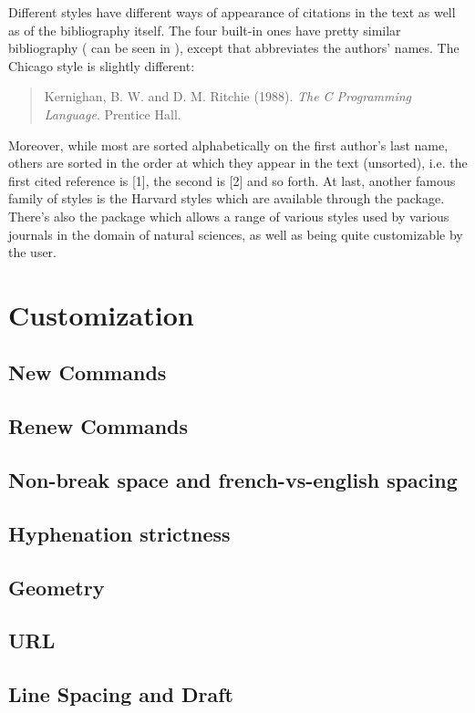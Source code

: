 {Different styles have different ways of appearance of citations in the text as well as of the bibliography itself. The four built-in ones have pretty similar bibliography ( can be seen in ), except that  abbreviates the authors' names. The Chicago style is slightly different:

\begin{quote}
Kernighan, B. W. and D. M. Ritchie (1988). \textit{The C Programming Language}. Prentice Hall.
\end{quote}

Moreover, while most are sorted alphabetically on the first author's last name, others are sorted in the order at which they appear in the text (unsorted), i.e. the first cited reference is [1], the second is [2] and so forth. At last, another famous family of styles is the Harvard styles which are available through the  package. There's also the  package which allows a range of various styles used by various journals in the domain of natural sciences, as well as being quite customizable by the user.

\section{Customization}
\subsection{New Commands}
\subsection{Renew Commands}
\subsection{Non-break space and french-vs-english spacing}
\subsection{Hyphenation strictness}
\subsection{Geometry}
\subsection{URL}
\subsection{Line Spacing and Draft}

}
